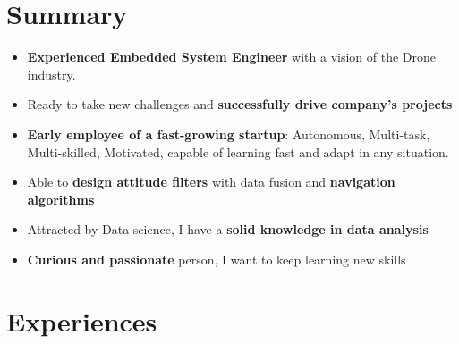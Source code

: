 \documentclass[a4paper]{friggeri-cv} %
\begin{document}
\section{Summary}
\begin{itemize}
\item \textbf{Experienced Embedded System Engineer} with a vision of the Drone industry.
\item Ready to take new challenges and \textbf{successfully drive company's projects}%
\item \textbf{Early employee of a fast-growing startup}: Autonomous, Multi-task, Multi-skilled, Motivated, capable of learning fast and adapt in any situation.
\item Able to \textbf{design attitude filters} with data fusion and \textbf{navigation algorithms}
\item Attracted by Data science, I have a \textbf{solid knowledge in data analysis}
\item \textbf{Curious and passionate} person, I want to keep learning new skills\\
\end{itemize}



\section{Experiences}
\end{document}
